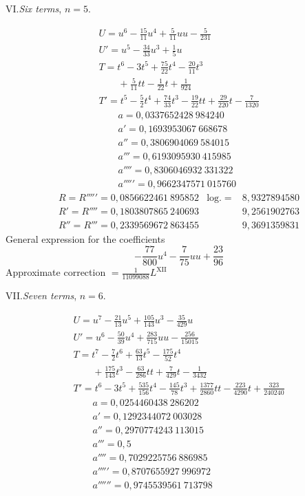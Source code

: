 \clearpage\begin{center}VI.\quad\textit{Six terms}, \(n=5\).\end{center}
\[
\begin{array}{l}
U=u^6-\frac{15}{11}u^4+\frac{5}{11}uu-\frac{5}{231}\\
U'=u^5-\frac{34}{33}u^3+\frac{1}{5}u\\
T=t^6-3t^5+\frac{75}{22}t^4-\frac{20}{11}t^3\\\qquad+\frac{5}{11}tt-\frac{1}{22}t+\frac{1}{924}\\
T'=t^5-\frac{5}{2}t^4+\frac{74}{33}t^3-\frac{19}{22}tt+\frac{29}{220}t-\frac{7}{1320}\\
\qquad a=0{,}0337652428\ 984240\\
\qquad a'=0{,}1693953067\ 668678\\
\qquad a''=0{,}3806904069\ 584015\\
\qquad a'''=0{,}6193095930\ 415985\\
\qquad a''''=0{,}8306046932\ 331322\\
\qquad a'''''=0{,}9662347571\ 015760
\end{array}
\]
\[
\begin{array}{lll}
R=R'''''=0{,}0856622461\ 895852&\mathrm{log.}=&8{,}9327894580\\
R'=R''''=0{,}1803807865\ 240693&&9{,}2561902763\\
R''=R'''=0{,}2339569672\ 863455&&9{,}3691359831
\end{array}
\]
\noindent General expression for the coefficients
\[
-\frac{77}{800}u^4-\frac{7}{75}uu+\frac{23}{96}
\]
\noindent Approximate correction \(=\frac{1}{11099088}L^{\mathrm{XII}}\)
\endgroup
{}
\begingroup\renewcommand{\arraystretch}{1.6}
\clearpage\begin{center}VII.\quad\textit{Seven terms}, \(n=6\).\end{center}
\[
\begin{array}{l}
U=u^7-\frac{21}{13}u^5+\frac{105}{143}u^3-\frac{35}{429}u\\
U'=u^6-\frac{50}{39}u^4+\frac{283}{715}uu-\frac{256}{15015}\\
T=t^7-\frac{7}{2}t^6+\frac{63}{13}t^5-\frac{175}{52}t^4\\\qquad+\frac{175}{143}t^3-\frac{63}{286}tt+\frac{7}{429}t-\frac{1}{3432}\\
T'=t^6-3t^5+\frac{535}{156}t^4-\frac{145}{78}t^3+\frac{1377}{2860}tt-\frac{223}{4290}t+\frac{323}{240240}\\
\qquad a=0{,}0254460438\ 286202\\
\qquad a'=0{,}1292344072\ 003028\\
\qquad a''=0{,}2970774243\ 113015\\
\qquad a'''=0{,}5\\
\qquad a''''=0{,}7029225756\ 886985\\
\qquad a'''''=0{,}8707655927\ 996972\\
\qquad a''''''=0{,}9745539561\ 713798
\end{array}
\]

